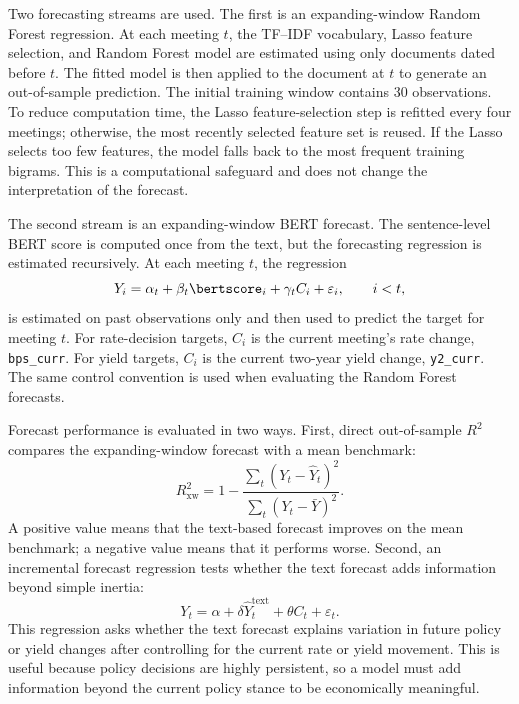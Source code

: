 Two forecasting streams are used. The first is an expanding-window Random Forest
regression. At each meeting \(t\), the TF--IDF vocabulary, Lasso feature
selection, and Random Forest model are estimated using only documents dated
before \(t\). The fitted model is then applied to the document at \(t\) to
generate an out-of-sample prediction. The initial training window contains
30 observations. To reduce computation time, the Lasso feature-selection step is
refitted every four meetings; otherwise, the most recently selected feature set
is reused. If the Lasso selects too few features, the model falls back to the
most frequent training bigrams. This is a computational safeguard and does not
change the interpretation of the forecast.

The second stream is an expanding-window BERT forecast. The sentence-level BERT
score is computed once from the text, but the forecasting regression is estimated
recursively. At each meeting \(t\), the regression
%
\begin{equation}
\label{eq:bert_xw}
  Y_i = \alpha_t + \beta_t \bertscore_i + \gamma_t C_i + \varepsilon_i,
  \qquad i < t,
\end{equation}
%
is estimated on past observations only and then used to predict the target for
meeting \(t\). For rate-decision targets, \(C_i\) is the current meeting's rate
change, \texttt{bps\_curr}. For yield targets, \(C_i\) is the current two-year
yield change, \texttt{y2\_curr}. The same control convention is used when
evaluating the Random Forest forecasts.

Forecast performance is evaluated in two ways. First, direct out-of-sample
\(R^2\) compares the expanding-window forecast with a mean benchmark:
%
\begin{equation}
\label{eq:xw_r2}
  R^2_{\text{xw}} = 1 -
  \frac{\sum_t (Y_t-\widehat{Y}_t)^2}
       {\sum_t (Y_t-\bar{Y})^2}.
\end{equation}
%
A positive value means that the text-based forecast improves on the mean
benchmark; a negative value means that it performs worse. Second, an incremental
forecast regression tests whether the text forecast adds information beyond
simple inertia:
%
\begin{equation}
\label{eq:rq2_incremental}
  Y_t = \alpha + \delta \widehat{Y}^{\text{text}}_t + \theta C_t + \varepsilon_t.
\end{equation}
%
This regression asks whether the text forecast explains variation in future
policy or yield changes after controlling for the current rate or yield movement.
This is useful because policy decisions are highly persistent, so a model must
add information beyond the current policy stance to be economically meaningful.

